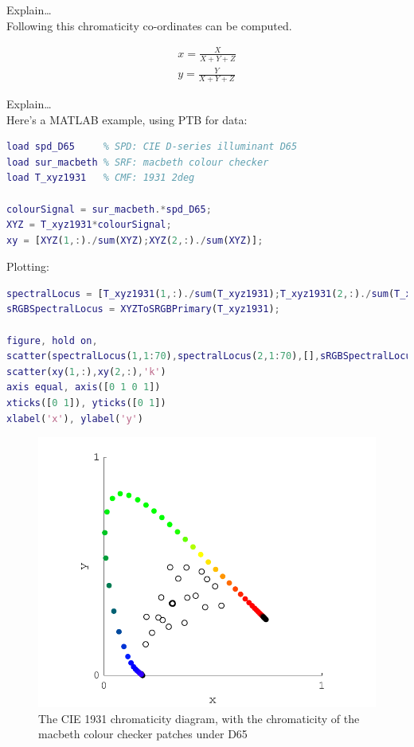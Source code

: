 Explain\dots \\
Following this chromaticity co-ordinates can be computed.

\begin{subequations}
\begin{align}
x=\frac{X}{X+Y+Z} \\
y=\frac{Y}{X+Y+Z} 
\end{align}
\end{subequations}

Explain\dots \\
Here's a \gls{MATLAB} example, using \gls{PTB} for data:

\begin{lstlisting}[language=MATLAB]
load spd_D65     % SPD: CIE D-series illuminant D65
load sur_macbeth % SRF: macbeth colour checker
load T_xyz1931   % CMF: 1931 2deg 

colourSignal = sur_macbeth.*spd_D65;
XYZ = T_xyz1931*colourSignal;
xy = [XYZ(1,:)./sum(XYZ);XYZ(2,:)./sum(XYZ)];
\end{lstlisting}

Plotting: 

\begin{lstlisting}[language=MATLAB]
spectralLocus = [T_xyz1931(1,:)./sum(T_xyz1931);T_xyz1931(2,:)./sum(T_xyz1931)];
sRGBSpectralLocus = XYZToSRGBPrimary(T_xyz1931);

figure, hold on, 
scatter(spectralLocus(1,1:70),spectralLocus(2,1:70),[],sRGBSpectralLocus(:,1:70)','filled')
scatter(xy(1,:),xy(2,:),'k')
axis equal, axis([0 1 0 1])
xticks([0 1]), yticks([0 1])
xlabel('x'), ylabel('y')
\end{lstlisting}

\begin{figure}[htbp]
\includegraphics[max width=\textwidth]{figs/LitRev/ColorimetryDemo1.pdf}
\caption{The CIE 1931 chromaticity diagram, with the chromaticity of the macbeth colour checker patches under D65}
\label{fig:1931}
\end{figure}







